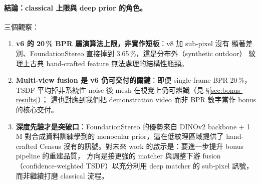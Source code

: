 \documentclass[12pt]{article}
\begin{document}
\paragraph{結論：classical 上限與 deep prior 的角色。} 三個觀察：
\begin{enumerate}
\item \textbf{v6 的 20\,\% BPR 屬演算法上限，非實作短板}：v8 加 sub-pixel 沒有
顯著差別、FoundationStereo 直接掉到 3.65\,\%，這是分布外（synthetic outdoor）
紋理上古典 hand-crafted feature 無法處理的結構性瓶頸。
\item \textbf{Multi-view fusion 是 v6 仍可交付的關鍵}：即便 single-frame BPR 20\,\%，
TSDF 平均掉非系統性 noise 後 mesh 在視覺上仍可辨識（見 §\ref{sec:bonus-results}）；
這也對應到我們把 demonstration video 而非 BPR 數字當作 bonus 的核心交付。
\item \textbf{深度先驗才是突破口}：FoundationStereo 的優勢來自 DINOv2 backbone
+ 1\,M 對合成資料訓練學到的 monocular prior，這在低紋理區域提供了 hand-crafted
Census 沒有的訊號。對未來 work 的啟示是：要進一步提升 bonus pipeline 的重建品質，
方向是接更強的 matcher 與調整下游 fusion（confidence-weighted TSDF）以充分利用
deep matcher 的 sub-pixel 訊號，而非繼續打磨 classical 流程。
\end{enumerate}

%
%
\end{document}
